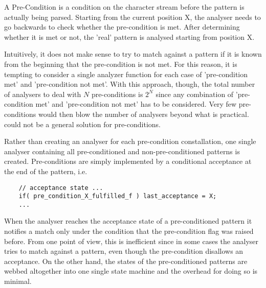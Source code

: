 A Pre-Condition is a condition on the character stream before the pattern is
actually being parsed. Starting from the current position X, the analyser needs
to go backwards to check whether the pre-condition is
met.  After determining whether it is met or not, the 'real' pattern is
analysed starting from position X.
	  
Intuitively, it does not make sense to try to match against a pattern if it is
known from the beginning that the pre-condition is not met. For this reason, it is tempting to
consider a single analyzer function for each case of 'pre-condition met' and
'pre-condition not met'.  With this approach, though, the total number of
analysers to deal with $N$ pre-conditions is $2^N$ since any combination of
'pre-condition met' and 'pre-condition not met' has to be considered. Very few
pre-conditions would then blow the number of analysers beyond what is
practical. {\Quex} could not be a general solution for pre-conditions.

Rather than creating an analyser for each pre-condition constallation, one
single analyser containing all pre-conditioned and non-pre-conditioned patterns
is created. Pre-conditions are simply implemented by a conditional acceptance
at the end of the pattern, i.e.

\begin{lstlisting}
    // acceptance state ...
    if( pre_condition_X_fulfilled_f ) last_acceptance = X;
    ...
\end{lstlisting}

When the analyser reaches the acceptance state of a pre-conditioned pattern it
notifies a match only under the condition that the pre-condition flag was
raised before. From one point of view, this is inefficient since in some cases the analyser tries 
to match against a pattern, even though the pre-condition disallows an acceptance. 
On the other hand, the states of the pre-conditioned patterns
are webbed altogether into one single state machine and the overhead for doing
so is minimal. 



